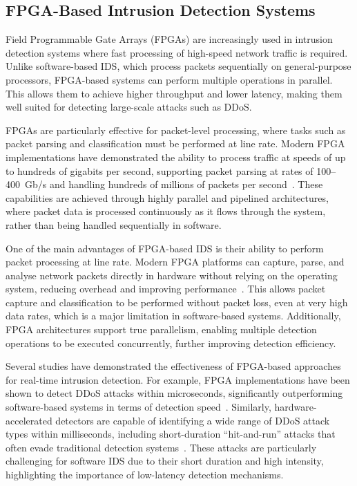 \subsection{FPGA-Based Intrusion Detection Systems}
Field Programmable Gate Arrays (FPGAs) are increasingly used in intrusion detection systems where fast processing of high-speed network traffic is required. Unlike software-based IDS, which process packets sequentially on general-purpose processors, FPGA-based systems can perform multiple operations in parallel. This allows them to achieve higher throughput and lower latency, making them well suited for detecting large-scale attacks such as DDoS.

FPGAs are particularly effective for packet-level processing, where tasks such as packet parsing and classification must be performed at line rate. Modern FPGA implementations have demonstrated the ability to process traffic at speeds of up to hundreds of gigabits per second, supporting packet parsing at rates of 100--400~Gb/s and handling hundreds of millions of packets per second~\cite{attig_400_2011}. These capabilities are achieved through highly parallel and pipelined architectures, where packet data is processed continuously as it flows through the system, rather than being handled sequentially in software.

One of the main advantages of FPGA-based IDS is their ability to perform packet processing at line rate. Modern FPGA platforms can capture, parse, and analyse network packets directly in hardware without relying on the operating system, reducing overhead and improving performance~\cite{shanmugam_denial_2019}. This allows packet capture and classification to be performed without packet loss, even at very high data rates, which is a major limitation in software-based systems. Additionally, FPGA architectures support true parallelism, enabling multiple detection operations to be executed concurrently, further improving detection efficiency.

Several studies have demonstrated the effectiveness of FPGA-based approaches for real-time intrusion detection. For example, FPGA implementations have been shown to detect DDoS attacks within microseconds, significantly outperforming software-based systems in terms of detection speed~\cite{hoque_real-time_2017}. Similarly, hardware-accelerated detectors are capable of identifying a wide range of DDoS attack types within milliseconds, including short-duration “hit-and-run” attacks that often evade traditional detection systems~\cite{nagy_detecting_2018, nagy_low-reaction_2018}. These attacks are particularly challenging for software IDS due to their short duration and high intensity, highlighting the importance of low-latency detection mechanisms.

